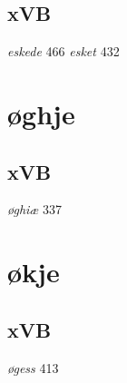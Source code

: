 \documentclass[a4paper,twocolumn]{article}
\begin{document}
\subsection{xVB}
\label{sec:orgddb6801}
\emph{eskede} 466 \emph{esket} 432 
\section{øghje}
\label{sec:orgd6f8c3f}
\subsection{xVB}
\label{sec:orgbe93f01}
\emph{øghiæ} 337 
\section{økje}
\label{sec:orgd8a72b2}
\subsection{xVB}
\label{sec:orgafefa77}
\emph{øgess} 413 
\end{document}
